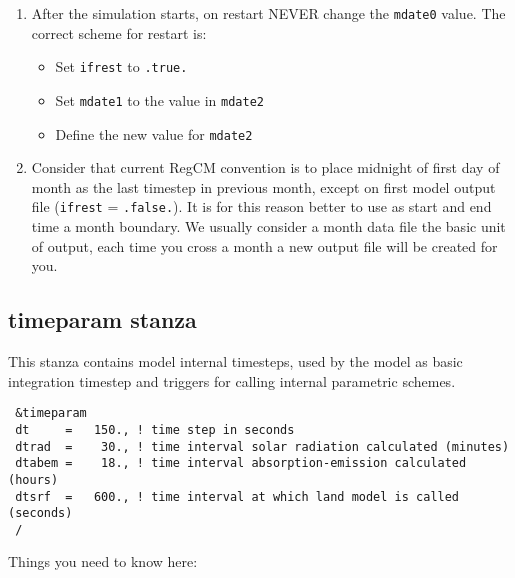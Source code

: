 \begin{enumerate}
\item After the simulation starts, on restart NEVER change the \verb=mdate0=
value. The correct scheme for restart is:
\begin{itemize}
\item Set \verb=ifrest= to \verb=.true.=
\item Set \verb=mdate1= to the value in \verb=mdate2=
\item Define the new value for \verb=mdate2=
\end{itemize}
\item Consider that current RegCM convention is to place midnight of first
day of month as the last timestep in previous month, except on first model
output file (\verb=ifrest= = \verb=.false.=). It is for this reason better
to use as start and end time a month boundary. We usually consider a month
data file the basic unit of output, each time you cross a month a new output
file will be created for you.
\end{enumerate}

\subsection{timeparam stanza}

This stanza contains model internal timesteps, used by the model as basic
integration timestep and triggers for calling internal parametric schemes.

{\footnotesize
\begin{Verbatim}
 &timeparam
 dt     =   150., ! time step in seconds
 dtrad  =    30., ! time interval solar radiation calculated (minutes)
 dtabem =    18., ! time interval absorption-emission calculated (hours)
 dtsrf  =   600., ! time interval at which land model is called (seconds)
 /
\end{Verbatim}
}

Things you need to know here:

